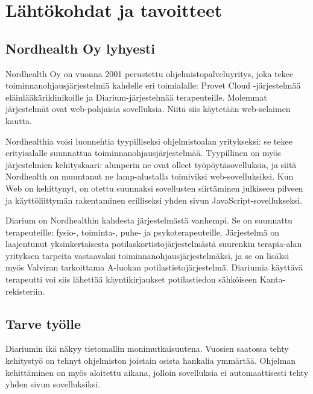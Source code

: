 \hypertarget{luxe4htuxf6kohdat-ja-tavoitteet}{%
\chapter{Lähtökohdat ja
tavoitteet}\label{luxe4htuxf6kohdat-ja-tavoitteet}}

\hypertarget{nordhealth-oy-lyhyesti}{%
\section{Nordhealth Oy lyhyesti}\label{nordhealth-oy-lyhyesti}}

Nordhealth Oy on vuonna 2001 perustettu ohjelmistopalveluyritys, joka
tekee toiminnanohjausjärjestelmiä kahdelle eri toimialalle: Provet Cloud
\cite{ProvetCloudHomepage} -järjestelmää eläinlääkäriklinikoille ja
Diarium-järjestelmää \cite{DiariumHomepage} terapeuteille. Molemmat
järjestelmät ovat web-pohjaisia sovelluksia. Niitä siis käytetään
web-selaimen kautta.

Nordhealthia voisi luonnehtia tyypilliseksi ohjelmistoalan yritykseksi:
se tekee erityisalalle suunnattua toiminnanohjausjärjestelmää.
Tyypillinen on myös järjestelmien kehityskaari: alunperin ne ovat olleet
työpöytäsovelluksia, ja siitä Nordhealth on muuntanut ne
\acrlong{lamp}-alustalla toimiviksi web-sovelluksiksi. Kun Web on
kehittynyt, on otettu suunnaksi sovellusten siirtäminen julkiseen
pilveen ja käyttöliittymän rakentaminen erilliseksi yhden sivun
JavaScript-sovellukseksi.

Diarium on Nordhealthin kahdesta järjestelmästä vanhempi. Se on
suunnattu terapeuteille: fysio-, toiminta-, puhe- ja psykoterapeuteille.
Järjestelmä on laajentunut yksinkertaisesta
potilaskortistojärjestelmästä suurenkin terapia-alan yrityksen tarpeita
vastaavaksi toiminnanohjausjärjestelmäksi, ja se on lisäksi myös
Valviran tarkoittama A-luokan potilastietojärjestelmä. Diariumia
käyttävä terapeutti voi siis lähettää käyntikirjaukset potilastiedon
sähköiseen Kanta-rekisteriin.

\hypertarget{tarve-tyuxf6lle}{%
\section{Tarve työlle}\label{tarve-tyuxf6lle}}

Diariumin ikä näkyy tietomallin monimutkaisuutena. Vuosien saatossa
tehty kehitystyö on tehnyt ohjelmiston joistain osista hankalia
ymmärtää. Ohjelman kehittäminen on myös aloitettu aikana, jolloin
sovelluksia ei automaattisesti tehty yhden sivun sovelluksiksi.

